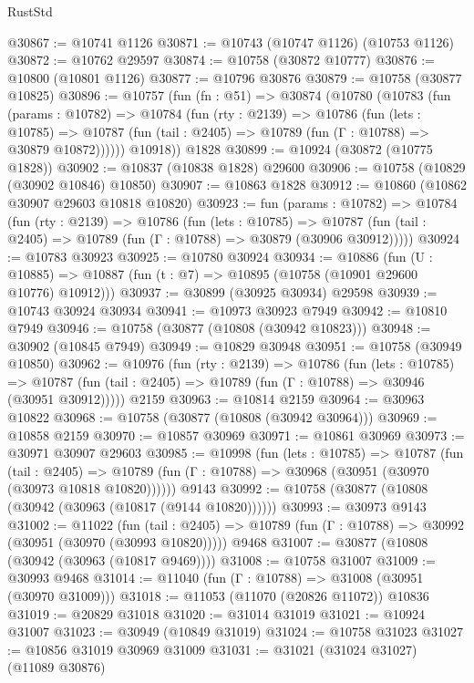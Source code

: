 \begin{lexlean}{RustStd}
\begin{coremodule}
@30867 := @10741 @1126
@30871 := @10743 (@10747 @1126) (@10753 @1126)
@30872 := @10762 @29597
@30874 := @10758 (@30872 @10777)
@30876 := @10800 (@10801 @1126)
@30877 := @10796 @30876
@30879 := @10758 (@30877 @10825)
@30896 := @10757
    (fun (fn : @51) =>
    @30874
      (@10780
        (@10783
          (fun (params : @10782) =>
          @10784
            (fun (rty : @2139) =>
            @10786
              (fun (lets : @10785) =>
              @10787 (fun (tail : @2405) => @10789 (fun (Γ : @10788) => @30879 @10872))))))
        @10918))
    @1828
@30899 := @10924 (@30872 (@10775 @1828))
@30902 := @10837 (@10838 @1828) @29600
@30906 := @10758 (@10829 (@30902 @10846) @10850)
@30907 := @10863 @1828
@30912 := @10860 (@10862 @30907 @29603 @10818 @10820)
@30923 := fun (params : @10782) =>
  @10784
    (fun (rty : @2139) =>
    @10786
      (fun (lets : @10785) =>
      @10787 (fun (tail : @2405) => @10789 (fun (Γ : @10788) => @30879 (@30906 @30912)))))
@30924 := @10783 @30923
@30925 := @10780 @30924
@30934 := @10886
    (fun (U : @10885) => @10887 (fun (t : @7) => @10895 (@10758 (@10901 @29600 @10776) @10912)))
@30937 := @30899 (@30925 @30934) @29598
@30939 := @10743 @30924 @30934
@30941 := @10973 @30923 @7949
@30942 := @10810 @7949
@30946 := @10758 (@30877 (@10808 (@30942 @10823)))
@30948 := @30902 (@10845 @7949)
@30949 := @10829 @30948
@30951 := @10758 (@30949 @10850)
@30962 := @10976
    (fun (rty : @2139) =>
    @10786
      (fun (lets : @10785) =>
      @10787 (fun (tail : @2405) => @10789 (fun (Γ : @10788) => @30946 (@30951 @30912)))))
    @2159
@30963 := @10814 @2159
@30964 := @30963 @10822
@30968 := @10758 (@30877 (@10808 (@30942 @30964)))
@30969 := @10858 @2159
@30970 := @10857 @30969
@30971 := @10861 @30969
@30973 := @30971 @30907 @29603
@30985 := @10998
    (fun (lets : @10785) =>
    @10787
      (fun (tail : @2405) =>
      @10789 (fun (Γ : @10788) => @30968 (@30951 (@30970 (@30973 @10818 @10820))))))
    @9143
@30992 := @10758 (@30877 (@10808 (@30942 (@30963 (@10817 (@9144 @10820))))))
@30993 := @30973 @9143
@31002 := @11022
    (fun (tail : @2405) => @10789 (fun (Γ : @10788) => @30992 (@30951 (@30970 (@30993 @10820)))))
    @9468
@31007 := @30877 (@10808 (@30942 (@30963 (@10817 @9469))))
@31008 := @10758 @31007
@31009 := @30993 @9468
@31014 := @11040 (fun (Γ : @10788) => @31008 (@30951 (@30970 @31009)))
@31018 := @11053 (@11070 (@20826 @11072)) @10836
@31019 := @20829 @31018
@31020 := @31014 @31019
@31021 := @10924 @31007
@31023 := @30949 (@10849 @31019)
@31024 := @10758 @31023
@31027 := @10856 @31019 @30969 @31009
@31031 := @31021 (@31024 @31027) (@11089 @30876)

\end{coremodule}
\end{lexlean}
